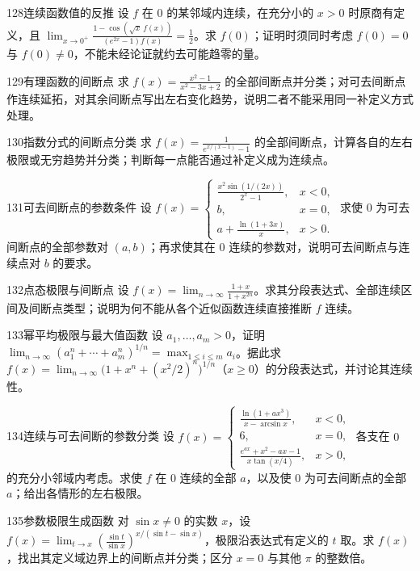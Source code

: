 \begin{exercise}{128}{连续函数值的反推}
设 $f$ 在 $0$ 的某邻域内连续，在充分小的 $x>0$ 时原商有定义，且 $\lim_{x\to0^+}\frac{1-\cos(\sqrt x\,f(x))}{(e^{2x}-1)f(x)}=\frac12$。求 $f(0)$；证明时须同时考虑 $f(0)=0$ 与 $f(0)\ne0$，不能未经论证就约去可能趋零的量。
\end{exercise}
\begin{exercise}{129}{有理函数的间断点}
求 $f(x)=\frac{x^2-1}{x^2-3x+2}$ 的全部间断点并分类；对可去间断点作连续延拓，对其余间断点写出左右变化趋势，说明二者不能采用同一补定义方式处理。
\end{exercise}
\begin{exercise}{130}{指数分式的间断点分类}
求 $f(x)=\frac1{e^{x/(x-1)}-1}$ 的全部间断点，计算各自的左右极限或无穷趋势并分类；判断每一点能否通过补定义成为连续点。
\end{exercise}
\begin{exercise}{131}{可去间断点的参数条件}
设 $f(x)=\begin{cases}\frac{x^2\sin(1/(2x))}{2^x-1},&x<0,\\b,&x=0,\\a+\frac{\ln(1+3x)}x,&x>0.\end{cases}$ 求使 $0$ 为可去间断点的全部参数对 $(a,b)$；再求使其在 $0$ 连续的参数对，说明可去间断点与连续点对 $b$ 的要求。
\end{exercise}
\begin{exercise}{132}{点态极限与间断点}
设 $f(x)=\lim_{n\to\infty}\frac{1+x}{1+x^{2n}}$。求其分段表达式、全部连续区间及间断点类型；说明为何不能从各个近似函数连续直接推断 $f$ 连续。
\end{exercise}
\begin{exercise}{133}{幂平均极限与最大值函数}
设 $a_1,\ldots,a_m>0$，证明 $\lim_{n\to\infty}(a_1^n+\cdots+a_m^n)^{1/n}=\max_{1\le i\le m}a_i$。据此求 $f(x)=\lim_{n\to\infty}\bigl(1+x^n+(x^2/2)^n\bigr)^{1/n}$（$x\ge0$）的分段表达式，并讨论其连续性。
\end{exercise}
\begin{exercise}{134}{连续与可去间断的参数分类}
设 $f(x)=\begin{cases}\frac{\ln(1+ax^3)}{x-\arcsin x},&x<0,\\6,&x=0,\\\frac{e^{ax}+x^2-ax-1}{x\tan(x/4)},&x>0,\end{cases}$ 各支在 $0$ 的充分小邻域内考虑。求使 $f$ 在 $0$ 连续的全部 $a$，以及使 $0$ 为可去间断点的全部 $a$；给出各情形的左右极限。
\end{exercise}
\begin{exercise}{135}{参数极限生成函数}
对 $\sin x\ne0$ 的实数 $x$，设 $f(x)=\lim_{t\to x}\left(\frac{\sin t}{\sin x}\right)^{x/(\sin t-\sin x)}$，极限沿表达式有定义的 $t$ 取。求 $f(x)$，找出其定义域边界上的间断点并分类；区分 $x=0$ 与其他 $\pi$ 的整数倍。
\end{exercise}
